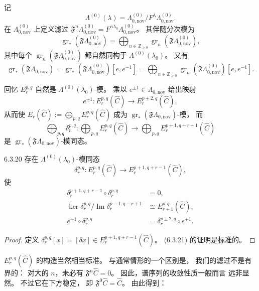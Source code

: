记
\[
\Lambda^{(0)}(\lambda)
=\Lambda_{0,\mathrm{nov}}^{(0)}
/F^\lambda\Lambda_{0,\mathrm{nov}}^{(0)}.
\]
在 $\Lambda_{0,\mathrm{nov}}^{(0)}$
上定义滤过
$\mathfrak F^n\Lambda_{0,\mathrm{nov}}^{(0)}
=F^{n\lambda_0}\Lambda_{0,\mathrm{nov}}^{(0)}$。
其伴随分次模为
\[
\operatorname{gr}_*
(\mathfrak F\Lambda_{0,\mathrm{nov}}^{(0)})
=\bigoplus_{n\in\mathbb Z_{\ge0}}
\operatorname{gr}_n
(\mathfrak F\Lambda_{0,\mathrm{nov}}^{(0)}),
\]
其中每个
$\operatorname{gr}_n
(\mathfrak F\Lambda_{0,\mathrm{nov}}^{(0)})$
都自然同构于 $\Lambda^{(0)}(\lambda_0)$。
又有
\[
\operatorname{gr}_*
(\mathfrak F\Lambda_{0,\mathrm{nov}})
=\operatorname{gr}_*
(\mathfrak F\Lambda_{0,\mathrm{nov}}^{(0)})
[e,e^{-1}]
=\bigoplus_{n\in\mathbb Z_{\ge0}}
\operatorname{gr}_n
(\mathfrak F\Lambda_{0,\mathrm{nov}}^{(0)})
[e,e^{-1}].
\]

回忆 $E_r^{p,q}$ 自然是
$\Lambda^{(0)}(\lambda_0)$-模。
乘以 $e^{\pm1}\in\Lambda_{0,\mathrm{nov}}$
给出映射
\[
e^{\pm1}:E_r^{p,q}(\widehat C)
\longrightarrow E_r^{p\pm2,q}(\widehat C),
\]
从而使
$E_r(\widehat C)
:=\bigoplus_{p,q}E_r^{p,q}(\widehat C)$
成为
$\operatorname{gr}_*(\mathfrak F\Lambda_{0,\mathrm{nov}})$-模，
而
\[
\bigoplus_{p,q}\delta_r^{p,q}:
\bigoplus_{p,q}E_r^{p,q}(\widehat C)
\longrightarrow
\bigoplus_{p,q}E_r^{p+1,q+r-1}(\widehat C)
\]
是 $\operatorname{gr}_*
(\mathfrak F\Lambda_{0,\mathrm{nov}})$-模同态。

\begin{lemma}{6.3.20}\label{lem:6-3-20}
存在 $\Lambda^{(0)}(\lambda_0)$-模同态
\[
\delta_r^{p,q}:E_r^{p,q}(\widehat C)
\longrightarrow
E_r^{p+1,q+r-1}(\widehat C),
\]
使
\begin{align}
\delta_r^{p+1,q+r-1}\circ\delta_r^{p,q}
&=0,
\tag{6.3.21.1}\label{eq:6-3-21-1}\\
\ker\delta_r^{p,q}
/\operatorname{Im}\delta_r^{p-1,q-r+1}
&\cong E_{r+1}^{p,q}(\widehat C),
\tag{6.3.21.2}\label{eq:6-3-21-2}\\
e^{\pm1}\circ\delta_r^{p,q}
&=\delta_r^{p\pm2,q}\circ e^{\pm1}.
\tag{6.3.21.3}\label{eq:6-3-21-3}
\end{align}
\end{lemma}

\begin{proof}
定义
$\delta_r^{p,q}[x]=[\delta x]
\in E_r^{p+1,q+r-1}(\widehat C)$。
(6.3.21) 的证明是标准的。
\end{proof}

$E_r^{p,q}(\widehat C)$ 的构造当然相当标准。
与通常情形的一个区别是，
我们的滤过不是有界的：
对大的 $n$，未必有
$\mathfrak F^n\widehat C=0$。
因此，谱序列的收敛性质一般而言
远非显然。
不过它在下方稳定，
即 $\mathfrak F^0\widehat C=\widehat C$。
由此得到：

